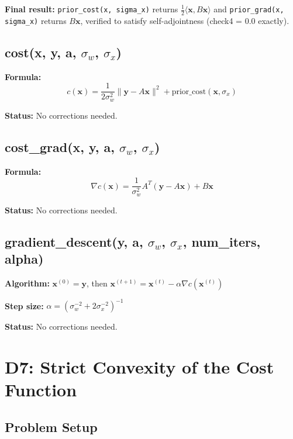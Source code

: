 \documentclass[12pt]{article}
\begin{document}
\textbf{Final result:} \texttt{prior\_cost(x, sigma\_x)} returns $\frac{1}{2} \langle \mathbf{x}, B\mathbf{x} \rangle$ and \texttt{prior\_grad(x, sigma\_x)} returns $B\mathbf{x}$, verified to satisfy self-adjointness (check4 = 0.0 exactly).

\subsection*{cost(x, y, a, $\sigma_w$, $\sigma_x$)}

\textbf{Formula:}
\begin{equation*}
c(\mathbf{x}) = \frac{1}{2\sigma_w^2} \|\mathbf{y} - A\mathbf{x}\|^2 + \text{prior\_cost}(\mathbf{x}, \sigma_x)
\end{equation*}

\textbf{Status:} No corrections needed.

\subsection*{cost\_grad(x, y, a, $\sigma_w$, $\sigma_x$)}

\textbf{Formula:}
\begin{equation*}
\nabla c(\mathbf{x}) = \frac{1}{\sigma_w^2} A^T(\mathbf{y} - A\mathbf{x}) + B\mathbf{x}
\end{equation*}

\textbf{Status:} No corrections needed.

\subsection*{gradient\_descent(y, a, $\sigma_w$, $\sigma_x$, num\_iters, alpha)}

\textbf{Algorithm:} $\mathbf{x}^{(0)} = \mathbf{y}$, then $\mathbf{x}^{(t+1)} = \mathbf{x}^{(t)} - \alpha \nabla c(\mathbf{x}^{(t)})$

\textbf{Step size:} $\alpha = (\sigma_w^{-2} + 2\sigma_x^{-2})^{-1}$

\textbf{Status:} No corrections needed.

\section*{D7: Strict Convexity of the Cost Function}

\subsection*{Problem Setup}
\end{document}
